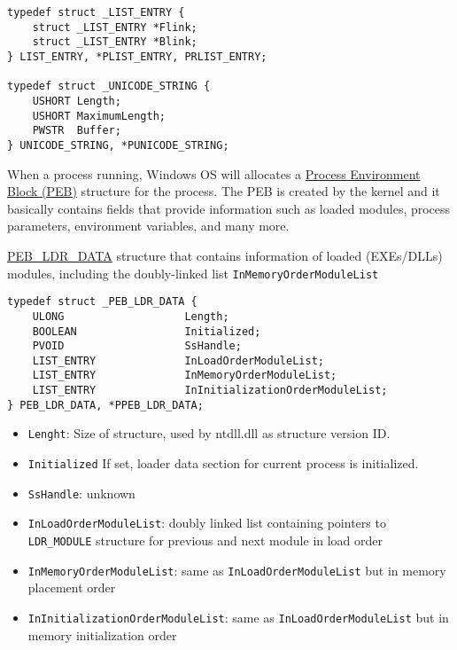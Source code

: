 \begin{verbatim}
typedef struct _LIST_ENTRY {
    struct _LIST_ENTRY *Flink;
    struct _LIST_ENTRY *Blink;
} LIST_ENTRY, *PLIST_ENTRY, PRLIST_ENTRY;
    
typedef struct _UNICODE_STRING {
    USHORT Length;
    USHORT MaximumLength;
    PWSTR  Buffer;
} UNICODE_STRING, *PUNICODE_STRING;
\end{verbatim}

When a process running, Windows OS will allocates a \href{http://undocumented.ntinternals.net/index.html?page=UserMode%2FUndocumented%20Functions%2FNT%20Objects%2FProcess%2FPEB.html}{Process Environment Block (PEB)} structure for the process. The PEB is created by the kernel and it basically contains fields that provide information such as loaded modules, process parameters, environment variables, and many more.

\href{http://undocumented.ntinternals.net/index.html?page=UserMode%2FUndocumented%20Functions%2FNT%20Objects%2FProcess%2FPEB.html}{PEB\_LDR\_DATA} structure that contains information of loaded (EXEs/DLLs) modules, including the doubly-linked list \verb+InMemoryOrderModuleList+ 

\begin{verbatim}
typedef struct _PEB_LDR_DATA {
    ULONG                   Length;
    BOOLEAN                 Initialized;
    PVOID                   SsHandle;
    LIST_ENTRY              InLoadOrderModuleList;
    LIST_ENTRY              InMemoryOrderModuleList;
    LIST_ENTRY              InInitializationOrderModuleList;
} PEB_LDR_DATA, *PPEB_LDR_DATA;
\end{verbatim}

\begin{itemize}
    \item \verb+Lenght+: Size of structure, used by ntdll.dll as structure version ID.
    \item \verb+Initialized+ If set, loader data section for current process is initialized.
    \item \verb+SsHandle+: unknown
    \item \verb+InLoadOrderModuleList+: doubly linked list containing pointers to \verb+LDR_MODULE+ structure for previous and next module in load order
    \item \verb+InMemoryOrderModuleList+: same as \verb+InLoadOrderModuleList+ but in memory placement order 
    \item \verb+InInitializationOrderModuleList+: same as \verb+InLoadOrderModuleList+ but in memory initialization order 
\end{itemize}


